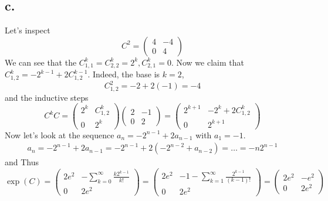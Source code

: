 \documentclass[11pt]{article}
\theoremstyle{mystyle}
\theoremstyle{definition}
\begin{document}
\subsection*{c.}
Let's inspect 
\[
  C^2 = 
  \begin{pmatrix}
    4 & -4 \\
    0 & 4
  \end{pmatrix}
\]
We can see that the $C^k_{1,1} = C^k_{2,2} = 2^k, C^k_{2,1} = 0$. Now we claim that $C^k_{1,2} = -2^{k-1} + 2C^{k-1}_{1,2}$. Indeed, the base is $k = 2$, 
\[
  C_{1,2}^2 = -2 + 2 (-1) = -4
\]
and the inductive steps
\[
  C^k C = 
  \begin{pmatrix}
    2^k & C^k_{1,2} \\
    0 & 2^k
  \end{pmatrix}
  \begin{pmatrix}
    2 & -1 \\
    0 & 2
  \end{pmatrix}
  =
  \begin{pmatrix}
    2^{k+1} & -2^k + 2C_{1,2}^k \\
    0 & 2^{k+1}
  \end{pmatrix}
\]
Now let's look at the sequence $a_n = -2^{n-1} + 2a_{n-1}$ with $a_1 = -1$.
\begin{align*}
  a_n = -2^{n-1} + 2a_{n-1} = -2^{n-1} + 2 (-2^{n-2} + a_{n-2}) = \hdots = -n2^{n-1}
\end{align*}
and 
Thus 
\[
  \exp(C) = 
  \begin{pmatrix}
    2e^2 & -\sum_{k=0}^\infty \displaystyle\frac{k2^{k-1}}{k!} \\
    0 & 2e^2
  \end{pmatrix}
  =
  \begin{pmatrix}
    2e^2 & -1 -\sum_{k=1}^\infty \displaystyle\frac{2^{k-1}}{(k-1)!} \\
    0 & 2e^2
  \end{pmatrix}
  =
  \begin{pmatrix}
    2e^2 & - e^2 \\
    0 & 2e^2
  \end{pmatrix}
\]
\end{document}
